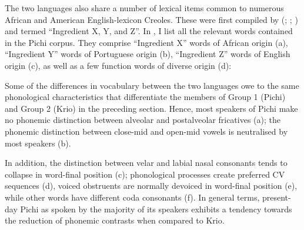 The two languages also share a number of lexical items common to numerous African and American English-lexicon Creoles. These were first compiled by (\citealt{Smith1987}; \citealt{Smith2001}; \citealt{Smith2015}) and termed “Ingredient X, Y, and Z”. In , I list all the relevant words contained in the Pichi corpus. They comprise “Ingredient X” words of African origin (a), “Ingredient Y” words of Portuguese origin (b), “Ingredient Z” words of English origin (c), as well as a few function words of diverse origin (d):

Some of the differences in vocabulary between the two languages owe to the same phonological characteristics that differentiate the members of Group 1 (Pichi) and Group 2 (Krio) in the preceding section. Hence, most speakers of Pichi make no phonemic distinction between alveolar and postalveolar fricatives (a); the phonemic distinction between close-mid and open-mid vowels is neutralised by most speakers (b). 


In addition, the distinction between velar and labial nasal consonants tends to collapse in word-final position (c); phonological processes create preferred CV sequences (d), voiced obstruents are normally devoiced in word-final position (e), while other words have different coda consonants (f). In general terms, present-day Pichi as spoken by the majority of its speakers exhibits a tendency towards the reduction of phonemic contrasts when compared to Krio.

